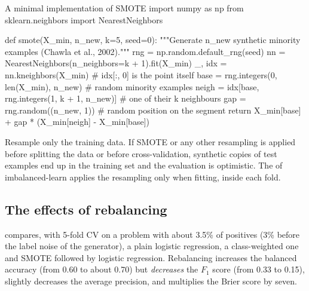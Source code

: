 \begin{pylisting}[label={lst:smote}]{A minimal implementation of SMOTE}
import numpy as np
from sklearn.neighbors import NearestNeighbors

def smote(X_min, n_new, k=5, seed=0):
    """Generate n_new synthetic minority examples (Chawla et al., 2002)."""
    rng = np.random.default_rng(seed)
    nn = NearestNeighbors(n_neighbors=k + 1).fit(X_min)
    _, idx = nn.kneighbors(X_min)                 # idx[:, 0] is the point itself
    base = rng.integers(0, len(X_min), n_new)      # random minority examples
    neigh = idx[base, rng.integers(1, k + 1, n_new)]   # one of their k neighbours
    gap = rng.random((n_new, 1))                   # random position on the segment
    return X_min[base] + gap * (X_min[neigh] - X_min[base])
\end{pylisting}

\begin{pitfall}
Resample only the training data. If SMOTE or any other resampling is applied before splitting
the data or before cross-validation, synthetic copies of test examples end up in the training
set and the evaluation is optimistic. The  of \textsf{imbalanced-learn}
\citep{lemaitre2017imbalanced} applies the resampling only when fitting, inside each fold.
\end{pitfall}

\subsection{The effects of rebalancing}

 compares, with 5-fold CV on a problem with about 3.5\% of positives (3\% before the label noise
of the generator), a plain
logistic regression, a class-weighted one and SMOTE followed by logistic regression. Rebalancing
increases the balanced accuracy (from 0.60 to about 0.70) but \emph{decreases} the $F_1$ score
(from 0.33 to 0.15), slightly decreases the average precision, and multiplies the Brier score
by seven.

